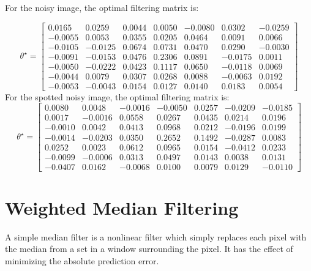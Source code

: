 \documentclass[paper=a4, fontsize=11pt]{scrartcl} %
\numberwithin{equation}{section} %
\numberwithin{figure}{section} %
\numberwithin{table}{section} %
\begin{document}
For the noisy image, the optimal filtering matrix is: 

\[
\theta^{\star} = 
\begin{bmatrix}
0.0165  &  0.0259   & 0.0044  &  0.0050  & -0.0080   & 0.0302   &-0.0259\\

-0.0055  &  0.0053  &  0.0355  &  0.0205 &0.0464   & 0.0091  &  0.0066\\

-0.0105  & -0.0125   & 0.0674  &  0.0731& 0.0470  &  0.0290  & -0.0030\\

-0.0091  & -0.0153  &  0.0476  &  0.2306 &0.0891  & -0.0175  &  0.0011\\

-0.0050  & -0.0222  &  0.0423   & 0.1117 &0.0650  & -0.0118 &   0.0069\\

-0.0044   & 0.0079  &  0.0307  &  0.0268& 0.0088  & -0.0063  &  0.0192\\

-0.0053  & -0.0043  &  0.0154  &  0.0127 & 0.0140 &   0.0183    &0.0054



\end{bmatrix}
\]
For the spotted noisy image, the optimal filtering matrix is: 
\[
\theta^{\star} = 
\begin{bmatrix}
    0.0080   & 0.0048  & -0.0016 &  -0.0050 &0.0257   &-0.0209   &-0.0185\\

0.0017  & -0.0016   & 0.0558  &  0.0267     &0.0435  &  0.0214  &  0.0196\\

-0.0010  &  0.0042  &  0.0413   & 0.0968& 0.0212 &  -0.0196   & 0.0199\\

-0.0014 &  -0.0203  &  0.0350  &  0.2652& 0.1492  & -0.0287   & 0.0083\\

0.0252   & 0.0023   & 0.0612   & 0.0965 &0.0154   &-0.0412  &  0.0233\\

-0.0099  & -0.0006  &  0.0313  &  0.0497 &0.0143  &  0.0038   & 0.0131\\

-0.0407   & 0.0162  & -0.0068  &  0.0100& 0.0079   & 0.0129 &  -0.0110


\end{bmatrix}
\]

\section{Weighted Median Filtering}
A simple median filter is a nonlinear filter which simply replaces each pixel with the
median from a set in a window surrounding the pixel. It has the effect of minimizing the
absolute prediction error.
\end{document}

